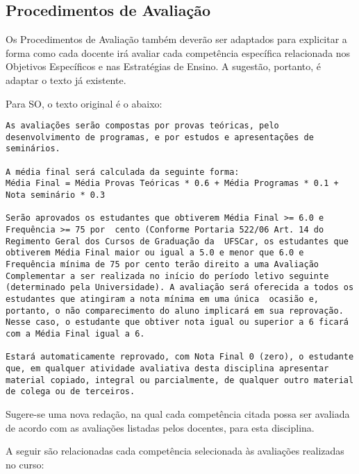 \documentclass[12pt, oneside]{book}
\begin{document}
\subsection*{Procedimentos de Avaliação}
Os Procedimentos de Avaliação também deverão ser adaptados para explicitar a forma como cada docente irá avaliar cada competência específica relacionada nos Objetivos Específicos e nas Estratégias de Ensino. A sugestão, portanto, é adaptar o texto já existente.

Para SO, o texto original é o abaixo:

\begin{lstlisting}
As avaliações serão compostas por provas teóricas, pelo desenvolvimento de programas, e por estudos e apresentações de seminários.

A média final será calculada da seguinte forma:
Média Final = Média Provas Teóricas * 0.6 + Média Programas * 0.1 + Nota seminário * 0.3

Serão aprovados os estudantes que obtiverem Média Final >= 6.0 e Frequência >= 75 por  cento (Conforme Portaria 522/06 Art. 14 do Regimento Geral dos Cursos de Graduação da  UFSCar, os estudantes que obtiverem Média Final maior ou igual a 5.0 e menor que 6.0 e  Frequência mínima de 75 por cento terão direito a uma Avaliação Complementar a ser realizada no início do período letivo seguinte (determinado pela Universidade). A avaliação será oferecida a todos os estudantes que atingiram a nota mínima em uma única  ocasião e, portanto, o não comparecimento do aluno implicará em sua reprovação. Nesse caso, o estudante que obtiver nota igual ou superior a 6 ficará com a Média Final igual a 6.

Estará automaticamente reprovado, com Nota Final 0 (zero), o estudante que, em qualquer atividade avaliativa desta disciplina apresentar material copiado, integral ou parcialmente, de qualquer outro material de colega ou de terceiros.
\end{lstlisting}

Sugere-se uma nova redação, na qual cada competência citada possa ser avaliada de acordo com as avaliações listadas pelos docentes, para esta disciplina.

A seguir são relacionadas cada competência selecionada às avaliações realizadas no curso:
\end{document}
